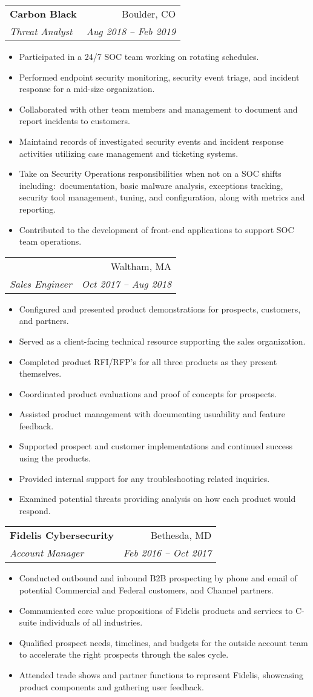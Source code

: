 \documentclass[letterpaper,11pt]{article}
\makeatletter
\newcommand{\resumeSubheading}[4]{
  \vspace{-1pt}\item
    \begin{tabular*}{0.97\textwidth}[t]{l@{\extracolsep{\fill}}r}
      \textbf{#1} & #2 \\
      \textit{\small#3} & \textit{\small #4} \\
    \end{tabular*}\vspace{-5pt}
}
\newcommand{\resumeSubSubheading}[4]{
  \vspace{2pt}
    \begin{tabular*}{0.97\textwidth}[t]{l@{\extracolsep{\fill}}r}
      #1 & #2 \\
      \textit{\small#3} & \textit{\small#4} \\
    \end{tabular*}\vspace{-5pt}
}
\newcommand{\resumeItemListStart}{\begin{itemize}[nosep]}
\newcommand{\resumeItemListEnd}{\end{itemize}\vspace{-5pt}}
\makeatother
\begin{document}
\resumeSubheading
{Carbon Black}{Boulder, CO}
{Threat Analyst}{Aug 2018 -- Feb 2019}
\resumeItemListStart
\item Participated in a 24/7 SOC team working on rotating schedules.
\item Performed endpoint security monitoring, security event triage, and incident response for a mid-size organization.
\item Collaborated with other team members and management to document and report incidents to customers.
\item Maintaind records of investigated security events and incident response activities utilizing case management and ticketing systems.
\item Take on Security Operations responsibilities when not on a SOC shifts including:\
documentation, basic malware analysis, exceptions tracking, security tool management, tuning, and configuration, along with metrics and reporting.
\item Contributed to the development of front-end applications to support SOC team operations.
\resumeItemListEnd

\resumeSubSubheading
{}{Waltham, MA}
{Sales Engineer}{Oct 2017 -- Aug 2018}
\resumeItemListStart
\item Configured and presented product demonstrations for prospects, customers, and partners.
\item Served as a client-facing technical resource supporting the sales organization.
\item Completed product RFI/RFP’s for all three products as they present themselves.
\item Coordinated product evaluations and proof of concepts for prospects.
\item Assisted product management with documenting usuability and feature feedback.
\item Supported prospect and customer implementations and continued success using the products.
\item Provided internal support for any troubleshooting related inquiries.
\item Examined potential threats providing analysis on how each product would respond.
\resumeItemListEnd

\resumeSubheading
{Fidelis Cybersecurity}{Bethesda, MD}
{Account Manager}{Feb 2016 -- Oct 2017}
\resumeItemListStart
\item Conducted outbound and inbound B2B prospecting by phone and email of potential Commercial and Federal customers, and Channel partners.
\item Communicated core value propositions of Fidelis products and services to C-suite individuals of all industries.
\item Qualified prospect needs, timelines, and budgets for the outside account team to accelerate the right prospects through the sales cycle.
\item Attended trade shows and partner functions to represent Fidelis, showcasing product components and gathering user feedback.
\resumeItemListEnd
\end{document}
